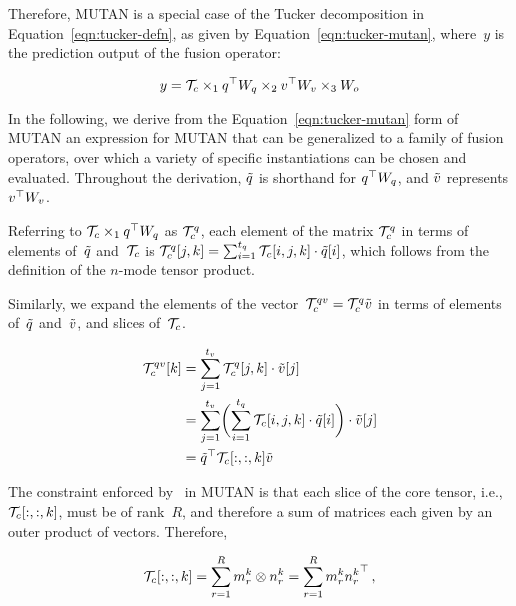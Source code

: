 Therefore, MUTAN is a special case of the Tucker decomposition in
Equation~\ref{eqn:tucker-defn}, as given by Equation~\ref{eqn:tucker-mutan},
where~$y$ is the prediction output of the fusion operator:

\begin{equation}
        y = \mathcal{T}_c \times_1
                q^\top{} W_{q}{} \times_2
                v^\top{} W_{v}{} \times_3
                W_o
        \label{eqn:tucker-mutan}
\end{equation}

In the following, we derive from the Equation~\ref{eqn:tucker-mutan} form of
MUTAN an expression for MUTAN that can be generalized to a family of fusion
operators, over which a variety of specific instantiations can be chosen and
evaluated.  Throughout the derivation, $\tilde{q}$ is shorthand for
$q^\top{} W_{q}{}$, and $\tilde{v}$ represents $v^\top{} W_{v}{}$.

Referring to $\mathcal{T}_c \times_1 q^\top{} W_{q}{}$ as $\mathcal{T}_c^{q}$, each element of
the matrix $\mathcal{T}_c^{q}$ in terms of elements of~$\tilde{q}$ and~$\mathcal{T}_c$ is
$\mathcal{T}_c^{q}[j, k] = \sum_{i = 1}^{t_q} \mathcal{T}_c[i, j, k] \cdot \tilde{q}[i]$,
which follows from the definition of the $n$-mode tensor product.

Similarly, we expand the elements of the
vector~$\mathcal{T}_c^{qv} = \mathcal{T}_c^{q} \tilde{v}$ in terms of elements
of~$\tilde{q}$ and~$\tilde{v}$, and slices of~$\mathcal{T}_c$.

\begin{align}
\begin{split}
        \mathcal{T}_c^{qv}[k] &= \sum_{j = 1}^{t_v} \mathcal{T}_c^{q}[j, k] \cdot \tilde{v}[j]  \\
                       &= \sum_{j = 1}^{t_v} \biggl(\sum_{i = 1}^{t_q} \mathcal{T}_c[i, j, k] \cdot \tilde{q}[i]\biggr) \cdot \tilde{v}[j]  \\
                       &= {\tilde{q}}^\top \mathcal{T}_c[:, :, k] \tilde{v}
\end{split}
\label{eqn:tucker-core-tensor-expanded}
\end{align}

The constraint enforced by~\cite{ben2017mutan} in MUTAN is that each slice of
the core tensor, i.e.,~$\mathcal{T}_c[:, :, k]$, must be of rank~$R$, and therefore a sum
of matrices each given by an outer product of vectors. Therefore,

\begin{equation}
        \mathcal{T}_c[:, :, k] = \sum_{r = 1}^R m_r^k \otimes n_r^k
                      = \sum_{r = 1}^R m_r^k {n_r^k}^\top \,,
\label{eqn:tucker-core-tensor-rank-r}
\end{equation}

